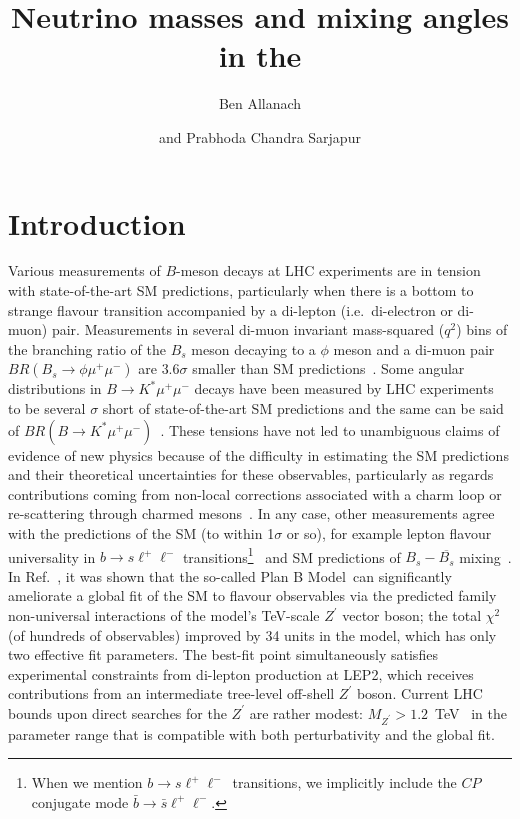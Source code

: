 \documentclass[11pt,letterpaper]{article}
\title{Neutrino masses and mixing angles in the \model}
\author[a]{Ben Allanach}
\affiliation[a]{DAMTP, University of Cambridge, Wilberforce Road, Cambridge, 
  CB3 0WA, United Kingdom}
\author{and Prabhoda Chandra Sarjapur\note{Corresponding author.}}
\newcommand{\model}{Plan B Model}
\newcommand{\bsll}{$b \rightarrow s \ell^+ \ell^-$}
\begin{document}
 
\maketitle
\flushbottom

\section{Introduction \label{sec:intro}}

Various measurements of $B$-meson decays at LHC experiments are in tension
with state-of-the-art SM predictions, particularly when there is a bottom to
strange flavour transition accompanied by a di-lepton (i.e.\ di-electron or
di-muon) pair.
Measurements in several di-muon invariant mass-squared ($q^2$)
bins of the branching ratio of the $B_s$ meson decaying to a $\phi$ meson and
a di-muon pair
$BR(B_s \rightarrow \phi \mu^+ \mu^-)$ are $3.6\sigma$ smaller than      SM
predictions~\cite{LHCb:2021zwz,CDF:2012qwd}.
Some angular distributions in $B \rightarrow K^\ast \mu^+ \mu^-$
decays have been measured by LHC
experiments~\cite{LHCb:2013ghj,ATLAS:2018gqc,CMS:2017rzx,CMS:2015bcy,Bobeth:2017vxj,LHCb:2020gog}
to be several $\sigma$ short of state-of-the-art SM
predictions and
the same can be said of $BR(B \rightarrow K^\ast \mu^+
\mu^-)$~\cite{Parrott:2022zte}.
These tensions have not led to unambiguous claims of evidence of new physics
because of the difficulty in estimating the  SM
predictions and their theoretical uncertainties for these observables,
particularly as regards 
contributions coming from non-local 
corrections associated with a charm loop or
re-scattering through charmed mesons~\cite{Ciuchini:2021smi}. 
In any case, other measurements agree with the
predictions of the SM (to
within 1$\sigma$ or so), for example lepton flavour universality in $b \rightarrow s
\ell^+ \ell^-$ transitions\footnote{When we mention \bsll\ transitions, we
implicitly include the $CP$ conjugate mode $\bar b \rightarrow \bar s \ell^+
\ell^-$.}~\cite{LHCb:2022qnv} and SM predictions of $B_s-{\overline{B_s}}$ mixing~\cite{PDG}.
In Ref.~\cite{Allanach:2023uxz}, it was shown that the so-called \model\ can
significantly ameliorate a global fit of the SM to flavour observables via the predicted
family non-universal 
interactions of the model's TeV-scale $Z^\prime$ vector boson; the total $\chi^2$ (of
hundreds of observables) improved by 34 units in the model, which has only two
effective fit parameters. 
The best-fit point simultaneously
satisfies experimental constraints from di-lepton production at LEP2, which receives contributions
from an intermediate tree-level off-shell $Z^\prime$ boson. Current LHC bounds upon
direct searches for the $Z^\prime$ are rather modest: $M_{Z^\prime} > 1.2$~TeV~\cite{Allanach:2024jls} in the parameter range that is compatible with both perturbativity and the global fit. 
\end{document}
